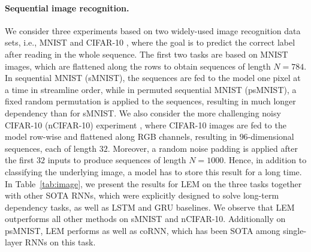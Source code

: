 \documentclass{article} \usepackage{iclr2022_conference,times}
\newcommand{\Tref}[1]{Table~\ref{#1}}
\begin{document}
\paragraph{Sequential image recognition.}
We consider three experiments based on two widely-used image recognition data sets, i.e., MNIST \citep{mnist} and CIFAR-10 \citep{cifar}, where the goal is to predict the correct label after reading in the whole sequence. The first two tasks are based on MNIST images, which are flattened along the rows to obtain sequences of length $N=784$. In sequential MNIST (sMNIST), the sequences are fed to the model one pixel at a time in streamline order, while in permuted sequential MNIST (psMNIST), a fixed random permutation is applied to the sequences, resulting in much longer dependency than for sMNIST. We also consider the more challenging noisy CIFAR-10 (nCIFAR-10) experiment \citep{anti}, where CIFAR-10 images are fed to the model row-wise and flattened along RGB channels, resulting in $96$-dimensional sequences, each of length $32$. Moreover, a random noise padding is applied after the first $32$ inputs to produce sequences of length $N=1000$. Hence, in addition to classifying the underlying image, a model has to store this result for a long time. In \Tref{tab:image}, we present the results for LEM on the three tasks together with other SOTA RNNs, which were explicitly designed to solve long-term dependency tasks, as well as LSTM and GRU baselines. We observe that LEM outperforms all other methods on sMNIST and nCIFAR-10. Additionally on psMNIST, LEM performs as well as coRNN, which has been SOTA among single-layer RNNs on this task.
\end{document}
